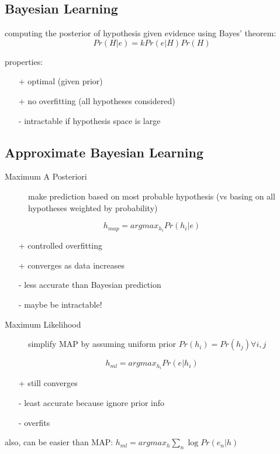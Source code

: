\documentclass[]{article}
\theoremstyle{definition}
\begin{document}
    \subsection{Bayesian Learning}
    \label{sub:bayesian_learning}

    computing the posterior of hypothesis given evidence using Bayes' theorem:
    \begin{equation*}
        Pr(H|e) = k Pr(e|H) Pr(H)
    \end{equation*}

    properties:
    \begin{itemize}
        \item[+] optimal (given prior)
        \item[+] no overfitting (all hypotheses considered)
        \item[-] intractable if hypothesis space is large
    \end{itemize}
    
    \subsection{Approximate Bayesian Learning}
    \label{sub:approximate_bayesian_learning}
    
    \begin{description}
        \item[Maximum A Posteriori] make prediction based on most probable hypothesis (vs basing on all hypotheses weighted by probability)
    \end{description}
    \begin{equation*}
        h_{map} = argmax_{h_i} Pr(h_i | e)
    \end{equation*}
    \begin{itemize}
        \item[+] controlled overfitting
        \item[+] converges as data increases
        \item[-] less accurate than Bayesian prediction
        \item[-] maybe be intractable!
    \end{itemize}

    \begin{description}
        \item[Maximum Likelihood] simplify MAP by assuming uniform prior $Pr(h_i) = Pr(h_j) \forall i,j$
    \end{description}
    \begin{equation*}
        h_{ml} = argmax_{h_i} Pr(e | h_i)
    \end{equation*}
    \begin{itemize}
        \item[+] still converges
        \item[-] least accurate because ignore prior info
        \item[-] overfits
    \end{itemize}
    also, can be easier than MAP: $h_{ml} = argmax_h \sum_n \log Pr(e_n|h)$
    
    
    
    
\end{document}
